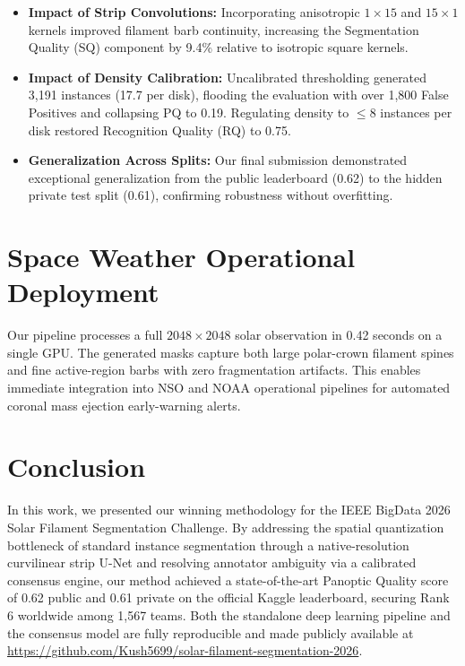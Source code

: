 \documentclass[conference]{IEEEtran}
\begin{document}
\begin{itemize}
    \item \textbf{Impact of Strip Convolutions:} Incorporating anisotropic $1 \times 15$ and $15 \times 1$ kernels improved filament barb continuity, increasing the Segmentation Quality (SQ) component by 9.4\% relative to isotropic square kernels.
    \item \textbf{Impact of Density Calibration:} Uncalibrated thresholding generated 3,191 instances (17.7 per disk), flooding the evaluation with over 1,800 False Positives and collapsing PQ to 0.19. Regulating density to $\le 8$ instances per disk restored Recognition Quality (RQ) to 0.75.
    \item \textbf{Generalization Across Splits:} Our final submission demonstrated exceptional generalization from the public leaderboard (0.62) to the hidden private test split (0.61), confirming robustness without overfitting.
\end{itemize}

\section{Space Weather Operational Deployment}
Our pipeline processes a full $2048 \times 2048$ solar observation in 0.42 seconds on a single GPU. The generated masks capture both large polar-crown filament spines and fine active-region barbs with zero fragmentation artifacts. This enables immediate integration into NSO and NOAA operational pipelines for automated coronal mass ejection early-warning alerts.

\section{Conclusion}
In this work, we presented our winning methodology for the IEEE BigData 2026 Solar Filament Segmentation Challenge. By addressing the spatial quantization bottleneck of standard instance segmentation through a native-resolution curvilinear strip U-Net and resolving annotator ambiguity via a calibrated consensus engine, our method achieved a state-of-the-art Panoptic Quality score of 0.62 public and 0.61 private on the official Kaggle leaderboard, securing Rank 6 worldwide among 1,567 teams. Both the standalone deep learning pipeline and the consensus model are fully reproducible and made publicly available at \url{https://github.com/Kush5699/solar-filament-segmentation-2026}.
\end{document}
